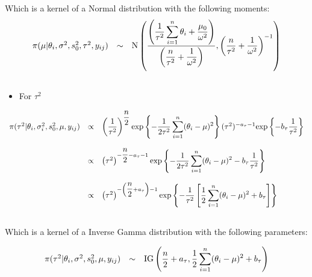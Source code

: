 \documentclass[a4paper, 11pt]{article}
\begin{document}
Which is a kernel of a Normal distribution with the following moments:\\
\begin{equation*}
\begin{array}{lcl ll }

\pi(\mu|\theta_i, \sigma^2, s_0^2, \tau^2, y_{ij}) & \sim &  \mbox{N} \left( \dfrac{ \left(\dfrac{1}{\tau^2}\displaystyle\sum_{i=1}^{n} \theta_i + \dfrac{\mu_0}{\omega^2} \right)}{\left( \dfrac{n}{\tau^2} +\dfrac{1}{\omega^2} \right)}, \left( \dfrac{n}{\tau^2} +\dfrac{1}{\omega^2} \right)^{-1} \right) \\\\

 \end{array}
\end{equation*}

\begin{itemize}
\item For $\tau^2$
\end{itemize}
\begin{equation*}
\begin{array}{lcl ll }

\pi(\tau^2 |\theta_i, \sigma_i^2, s_0^2, \mu, y_{ij}) & \propto & \left(\dfrac{1}{\tau^2}\right)^{\dfrac{n}{2}}\mbox{exp}\left\{ - \dfrac{1}{2\tau^2} 
\displaystyle\sum_{i=1}^{n} (\theta_i - \mu)^2\right\} (\tau^2)^{-a_\tau-1} \mbox{exp}\left\{ - b_\tau\dfrac{1}{\tau^2}\right\} \\ \\

& \propto & \left(\tau^2\right)^{-\dfrac{n}{2}-a_\tau-1}\mbox{exp}\left\{ - \dfrac{1}{2\tau^2} 
\displaystyle\sum_{i=1}^{n} (\theta_i - \mu)^2 - b_\tau\dfrac{1}{\tau^2}\right\} \\ \\

& \propto & \left(\tau^2\right)^{-\left(\dfrac{n}{2}+a_\tau\right)-1}\mbox{exp}\left\{ - \dfrac{1}{\tau^2} \left[\dfrac{1}{2}
\displaystyle\sum_{i=1}^{n} (\theta_i - \mu)^2 + b_\tau\right]\right\} \\ \\

 \end{array}
\end{equation*}

Which is a kernel of a Inverse Gamma distribution with the following parameters:

\begin{equation*}
\begin{array}{lcl ll }

\pi(\tau^2| \theta_i, \sigma^2, s_0^2, \mu, y_{ij}) & \sim &  \mbox{IG} \left( \dfrac{n}{2}+a_\tau , \dfrac{1}{2}
\displaystyle\sum_{i=1}^{n} (\theta_i - \mu)^2 + b_\tau \right)  \\\\

 \end{array}
\end{equation*}
\end{document}
